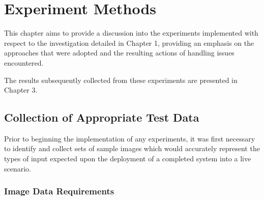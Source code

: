 \chapter{Experiment Methods}
%
%
%
%

This chapter aims to provide a discussion into the experiments implemented with respect to the investigation detailed in Chapter 1, providing an emphasis on the approaches that were adopted and the resulting actions of handling issues encountered.

The results subsequently collected from these experiments are presented in Chapter 3.

\section{Collection of Appropriate Test Data}

Prior to beginning the implementation of any experiments, it was first necessary to identify and collect sets of sample images which would accurately represent the types of input expected upon the deployment of a completed system into a live scenario. 

\subsection{Image Data Requirements}

